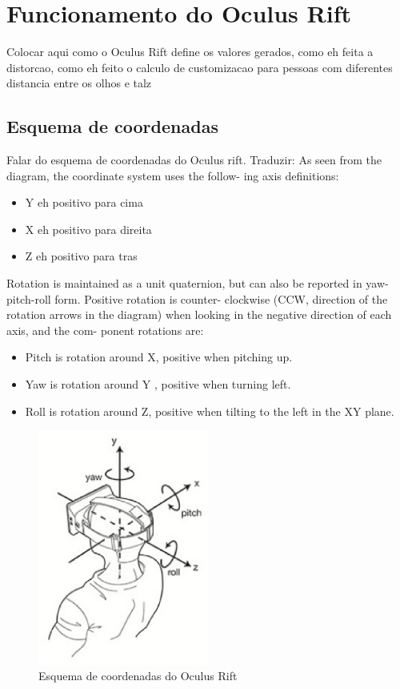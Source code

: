 \section{Funcionamento do Oculus Rift}
Colocar aqui como o Oculus Rift define os valores gerados, como eh feita a distorcao, como eh feito o calculo de customizacao para pessoas com diferentes distancia entre os olhos e talz

\subsection{Esquema de coordenadas}
Falar do esquema de coordenadas do Oculus rift. Traduzir:
As seen from the diagram, the coordinate system uses the follow-
ing axis definitions:
\begin{itemize}
	\item Y eh positivo para cima
	\item X eh positivo para direita
	\item Z eh positivo para tras
\end{itemize}
Rotation is maintained as a unit quaternion, but can also be
reported in yaw-pitch-roll form. Positive rotation is counter-
clockwise (CCW, direction of the rotation arrows in the diagram)
when looking in the negative direction of each axis, and the com-
ponent rotations are:
\begin{itemize}
	\item Pitch is rotation around X, positive when pitching up.
	\item Yaw is rotation around Y , positive when turning left.
	\item Roll is rotation around Z, positive when tilting to the left in the XY plane.
\end{itemize}

\begin{figure}[h]
  \centering
  \includegraphics[width=0.5\textwidth]
      {figuras/esquema_coordenadas_rift.eps}
  \caption{Esquema de coordenadas do Oculus Rift}
  \label{coordenadas-rift}
\end{figure}

